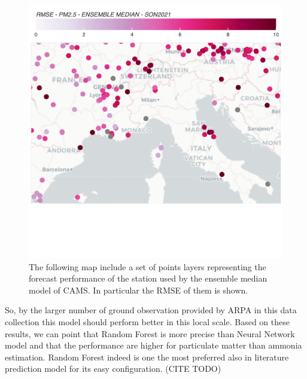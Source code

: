 \begin{figure}[H]
    \centering
    \includegraphics[scale=0.2]{src/images/cams_obs.png}
    \caption{The following map include a set of points layers representing the forecast performance of the station used by the ensemble median model of CAMS. In particular the RMSE of them is shown\cite{camsobs}. 
}
    \label{fig:cams}
\end{figure}

So, by the larger number of ground observation provided by ARPA in this data collection this model should perform better in this local scale.
\bigbreak
Based on these results, we can point that Random Forest is more precise than Neural Network model and that the performance are higher for particulate matter than ammonia estimation.
Random Forest indeed is one the most preferred also in literature prediction model for its easy configuration. (CITE TODO)
